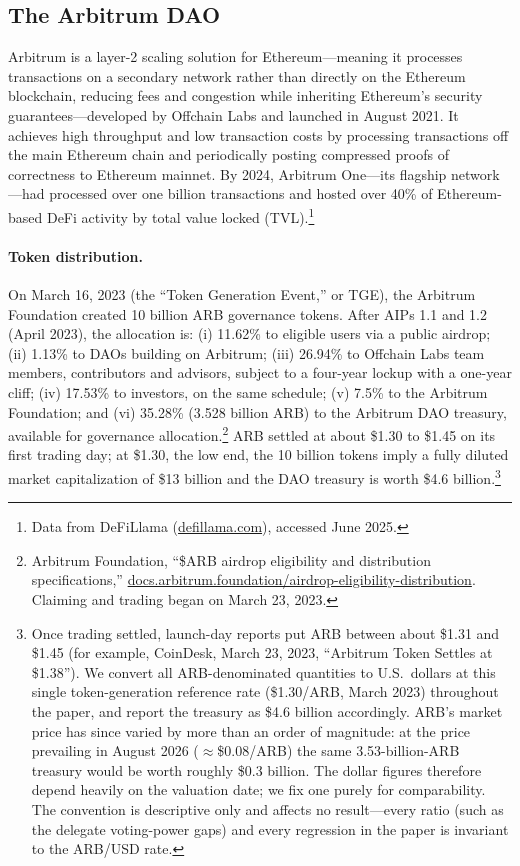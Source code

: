 \documentclass[12pt]{article}
\begin{document}
\subsection{The Arbitrum DAO}

Arbitrum is a layer-2 scaling solution for Ethereum---meaning it processes
transactions on a secondary network rather than directly on the Ethereum
blockchain, reducing fees and congestion while inheriting Ethereum's security guarantees---developed by Offchain Labs and
launched in August 2021. It achieves high throughput and low transaction costs by
processing transactions off the main Ethereum chain and periodically posting
compressed proofs of correctness to Ethereum mainnet. By 2024, Arbitrum One---its
flagship network---had processed over one billion transactions and hosted
over 40\% of Ethereum-based DeFi activity by total value locked (TVL).\footnote{Data
from DeFiLlama (\href{https://defillama.com}{defillama.com}), accessed June 2025.}

\paragraph{Token distribution.}
On March 16, 2023 (the ``Token Generation Event,'' or TGE), the Arbitrum Foundation
created 10 billion ARB governance tokens. After AIPs 1.1 and 1.2 (April 2023), the
allocation is: (i) 11.62\% to eligible users via a public airdrop; (ii) 1.13\% to
DAOs building on Arbitrum; (iii) 26.94\% to Offchain Labs team members, contributors
and advisors, subject to a four-year lockup with a one-year cliff; (iv) 17.53\% to
investors, on the same schedule; (v) 7.5\% to the Arbitrum Foundation; and (vi)
35.28\% (3.528 billion ARB) to the Arbitrum DAO treasury, available for governance
allocation.\footnote{Arbitrum Foundation, ``\$ARB airdrop eligibility and distribution specifications,'' \href{https://docs.arbitrum.foundation/airdrop-eligibility-distribution}{docs.arbitrum.foundation/airdrop-eligibility-distribution}. Claiming and trading began on March 23, 2023.}
ARB settled at about \$1.30 to \$1.45 on its first trading day; at \$1.30, the low end,
the 10 billion tokens imply a fully diluted market capitalization of \$13 billion and
the DAO treasury is worth \$4.6 billion.\footnote{Once trading settled, launch-day reports put ARB between about \$1.31 and \$1.45 (for example, CoinDesk, March 23, 2023, ``Arbitrum Token Settles at \$1.38''). We convert all ARB-denominated quantities to U.S.\ dollars at this single token-generation reference rate (\$1.30/ARB, March 2023) throughout the paper, and report the treasury as \$4.6 billion accordingly. ARB's market price has since varied by more than an order of magnitude: at the price prevailing in August 2026 ($\approx$\$0.08/ARB) the same 3.53-billion-ARB treasury would be worth roughly \$0.3 billion. The dollar figures therefore depend heavily on the valuation date; we fix one purely for comparability. The convention is descriptive only and affects no result---every ratio (such as the delegate voting-power gaps) and every regression in the paper is invariant to the ARB/USD rate.}
\end{document}
